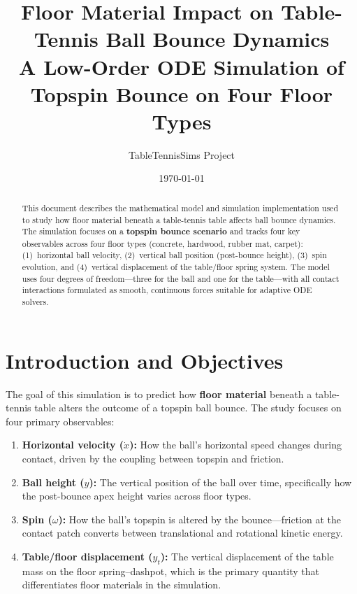 \documentclass[11pt,a4paper]{article}
\title{%
  \textbf{Floor Material Impact on Table-Tennis Ball Bounce Dynamics} \\[6pt]
  \large A Low-Order ODE Simulation of Topspin Bounce on Four Floor Types
}
\author{TableTennisSims Project}
\date{\today}
\begin{document}
\maketitle

\begin{abstract}
This document describes the mathematical model and simulation implementation
used to study how floor material beneath a table-tennis table affects ball
bounce dynamics. The simulation focuses on a \textbf{topspin bounce scenario}
and tracks four key observables across four floor types (concrete, hardwood,
rubber mat, carpet): (1)~horizontal ball velocity, (2)~vertical ball position
(post-bounce height), (3)~spin evolution, and (4)~vertical displacement of
the table/floor spring system. The model uses four degrees of freedom---three
for the ball and one for the table---with all contact interactions formulated
as smooth, continuous forces suitable for adaptive ODE solvers.
\end{abstract}

\tableofcontents
\newpage

\section{Introduction and Objectives}

The goal of this simulation is to predict how \textbf{floor material} beneath a
table-tennis table alters the outcome of a topspin ball bounce. The study
focuses on four primary observables:

\begin{enumerate}[nosep]
  \item \textbf{Horizontal velocity ($\dot{x}$):} How the ball's horizontal
    speed changes during contact, driven by the coupling between topspin and
    friction.
  \item \textbf{Ball height ($y$):} The vertical position of the ball over
    time, specifically how the post-bounce apex height varies across floor
    types.
  \item \textbf{Spin ($\omega$):} How the ball's topspin is altered by the
    bounce---friction at the contact patch converts between translational and
    rotational kinetic energy.
  \item \textbf{Table/floor displacement ($y_t$):} The vertical displacement
    of the table mass on the floor spring--dashpot, which is the primary
    quantity that differentiates floor materials in the simulation.
\end{enumerate}
\end{document}
